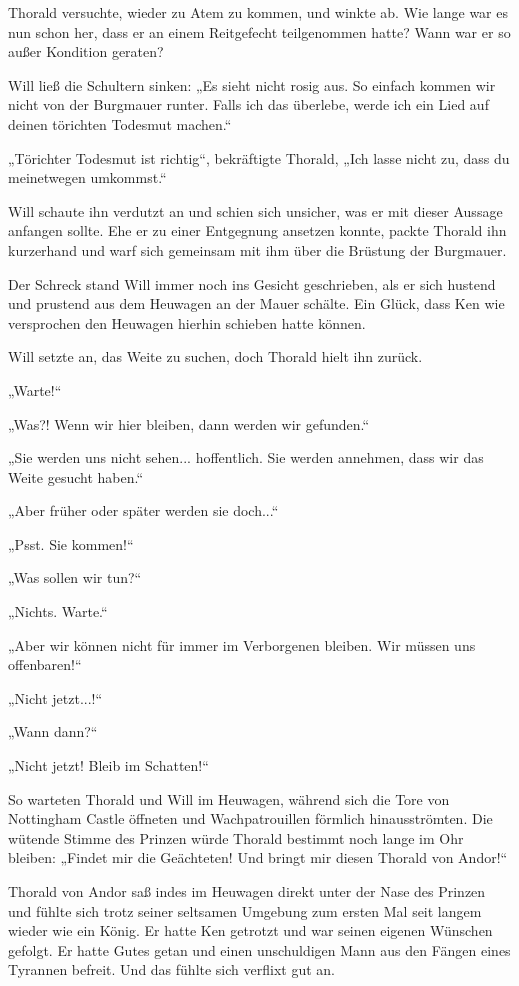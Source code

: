Thorald versuchte, wieder zu Atem zu kommen, und winkte ab. Wie lange war es nun schon her, dass er an einem Reitgefecht teilgenommen hatte? Wann war er so außer Kondition geraten?

Will ließ die Schultern sinken: „Es sieht nicht rosig aus. So einfach kommen wir nicht von der Burgmauer runter. Falls ich das überlebe, werde ich ein Lied auf deinen törichten Todesmut machen.“

„Törichter Todesmut ist richtig“, bekräftigte Thorald, „Ich lasse nicht zu, dass du meinetwegen umkommst.“

Will schaute ihn verdutzt an und schien sich unsicher, was er mit dieser Aussage anfangen sollte. Ehe er zu einer Entgegnung ansetzen konnte, packte Thorald ihn kurzerhand und warf sich gemeinsam mit ihm über die Brüstung der Burgmauer.

Der Schreck stand Will immer noch ins Gesicht geschrieben, als er sich hustend und prustend aus dem Heuwagen an der Mauer schälte. Ein Glück, dass Ken wie versprochen den Heuwagen hierhin schieben hatte können.

Will setzte an, das Weite zu suchen, doch Thorald hielt ihn zurück.

„Warte!“

„Was?! Wenn wir hier bleiben, dann werden wir gefunden.“

„Sie werden uns nicht sehen... hoffentlich. Sie werden annehmen, dass wir das Weite gesucht haben.“

„Aber früher oder später werden sie doch...“

„Psst. Sie kommen!“

„Was sollen wir tun?“

„Nichts. Warte.“

„Aber wir können nicht für immer im Verborgenen bleiben. Wir müssen uns offenbaren!“

„Nicht jetzt...!“

„Wann dann?“

„Nicht jetzt! Bleib im Schatten!“

So warteten Thorald und Will im Heuwagen, während sich die Tore von Nottingham Castle öffneten und Wachpatrouillen förmlich hinausströmten. Die wütende Stimme des Prinzen würde Thorald bestimmt noch lange im Ohr bleiben: „Findet mir die Geächteten! Und bringt mir diesen Thorald von Andor!“

Thorald von Andor saß indes im Heuwagen direkt unter der Nase des Prinzen und fühlte sich trotz seiner seltsamen Umgebung zum ersten Mal seit langem wieder wie ein König. Er hatte Ken getrotzt und war seinen eigenen Wünschen gefolgt. Er hatte Gutes getan und einen unschuldigen Mann aus den Fängen eines Tyrannen befreit. Und das fühlte sich verflixt gut an.



